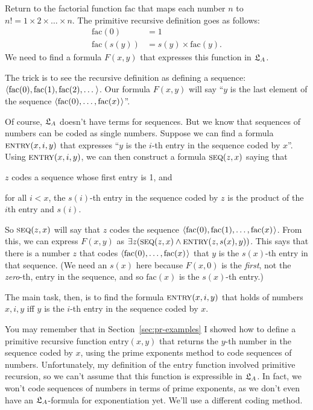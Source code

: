 Return to the factorial function $\mathrm{fac}$ that maps
each number $n$ to $n! = 1 \times 2 \times \ldots \times n$.
The primitive recursive definition goes as follows:
\begin{align*}
  \mathrm{fac}(0) & = 1 \\
  \mathrm{fac}(s(y)) & = s(y) \times \mathrm{fac}(y).
\end{align*}
We need to find a formula $F(x,y)$ that expresses this function in $\mathfrak{L}_{A}$.

The trick is to see the recursive definition as defining a sequence:
$\t{\mathrm{fac}(0), \mathrm{fac}(1), \mathrm{fac}(2), \ldots}$.
Our formula $F(x,y)$ will say ``$y$ is the last element of the sequence $\t{\mathrm{fac}(0), \ldots, \mathrm{fac}(x)}$''.

Of course,
$\mathfrak{L}_{A}$ doesn't have terms for sequences.
But we know that sequences of numbers can be coded as single numbers.
Suppose we can find a formula $\smallcaps{Entry}(x,i,y)$
that expresses ``$y$ is the $i$-th entry in the sequence coded by $x$''.
Using $\smallcaps{Entry}(x,i,y)$, we can then construct a formula $\smallcaps{Seq}(z,x)$
saying that
\begin{cenumerate}
  \item[(i)] $z$ codes a sequence whose first entry is 1, and
  \item[(ii)] for all $i<x$, the $s(i)$-th entry in the sequence coded by $z$ is the product of the $i$th entry and $s(i)$.
\end{cenumerate}
So $\smallcaps{Seq}(z,x)$ will say that
$z$ codes the sequence $\t{\mathrm{fac}(0), \mathrm{fac}(1), \ldots, \mathrm{fac}(x)}$.
From this,
we can express $F(x,y)$ as $\exists z(\smallcaps{Seq}(z,x) \land \smallcaps{Entry}(z,s(x),y))$.
This says that
there is a number $z$ that codes $\t{\mathrm{fac}(0), \ldots, \mathrm{fac}(x)}$
that $y$ is the $s(x)$-th entry in that sequence.
(We need an $s(x)$ here because $F(x,0)$ is the \emph{first}, not the \emph{zero}-th, entry in the sequence,
and so $\mathrm{fac}(x)$ is the $s(x)$-th entry.)

The main task, then,
is to find the formula $\smallcaps{Entry}(x,i,y)$
that holds of numbers $x,i,y$ iff
$y$ is the $i$-th entry in the sequence coded by $x$.

You may remember that
in Section~\ref{sec:pr-examples}
I showed how to define a primitive recursive function $\mathrm{entry}(x,y)$
that returns the $y$-th number in the sequence coded by $x$,
using the prime exponents method to code sequences of numbers.
Unfortunately,
my definition of the $\mathrm{entry}$ function involved primitive recursion,
so we can't assume that this function is expressible in $\mathfrak{L}_{A}$.
In fact,
we won't code sequences of numbers in terms of prime exponents,
as we don't even have an $\mathfrak{L}_{A}$-formula for exponentiation yet.
We'll use a different coding method.

